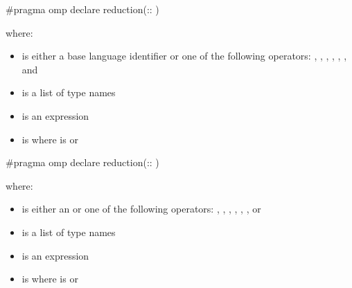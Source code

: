 \syntax
\begin{cspecific}
\begin{ompcPragma}
#pragma omp declare reduction(::
)
\end{ompcPragma}

where:

\begin{itemize}
\item {} is either a base language identifier or one of 
      the following operators: \code{+}, \code{-}, \code{*}, \code{&}, \code{|},
      \code{^}, \code{&&} and \code{||}
\item {} is a list of type names
\item {} is an expression
\item {} is \code{)}
      where  is\linebreak
       or \code{(}\code{)}
\end{itemize}
\end{cspecific}

\begin{cppspecific}
\begin{ompcPragma}
#pragma omp declare reduction(::
)
\end{ompcPragma}

where:

\begin{itemize}
\item {} is either an  or one of 
      the following operators: \code{+}, \code{-}, \code{*}, \code{&}, \code{|},
      \code{^}, \code{&&} or \code{||}
\item {} is a list of type names
\item {} is an expression

\item {} is \code{)}
      where  is\linebreak 
        or \code{(}\code{)}
\end{itemize}
\end{cppspecific}


